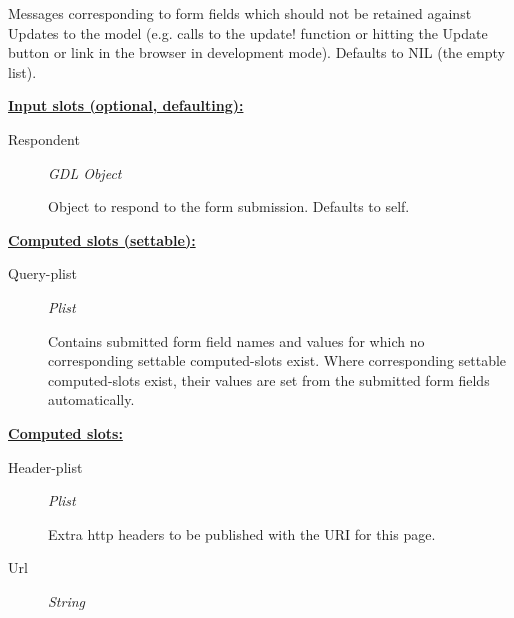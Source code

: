 \documentclass [11pt]{book}
\begin{document}
\begin{itemize}
\begin{description}
 Messages corresponding to form fields which should not be retained
against Updates to the model (e.g. calls to the update! function or hitting the Update button or link in
the browser in development mode). Defaults to NIL (the empty list).




\end{description}






\textbf{
\underline{Input slots (optional, defaulting):}}

\begin{description}

\item [Respondent]
\emph{GDL Object}

 Object to respond to the form submission. Defaults to self.




\end{description}






\textbf{
\underline{Computed slots (settable):}}

\begin{description}

\item [Query-plist]
\emph{Plist}

 Contains submitted form field names and values for which no corresponding settable
computed-slots exist. Where corresponding settable computed-slots exist, their values are set from
the submitted form fields automatically.




\end{description}






\textbf{
\underline{Computed slots:}}

\begin{description}

\item [Header-plist]
\emph{Plist}

 Extra http headers to be published with the URI for this page.




\item [Url]
\emph{String}


\end{description}
\end{itemize}
\end{document}
